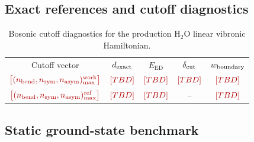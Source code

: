 \documentclass[
  reprint,
  amsmath,
  amssymb,
  aps,
  pra,
  nofootinbib,
  superscriptaddress,
  floatfix
]{revtex4-2}
\newcommand{\placeholder}[1]{\textcolor{red!70!black}{\ifmmode\left[#1\right]\else\textsf{[#1]}\fi}}
\newcommand{\ed}{\mathrm{ED}}
\newcommand{\HtwoO}{\mathrm{H_2O}}
\newcommand{\work}{\mathrm{work}}
\newcommand{\refc}{\mathrm{ref}}
\begin{document}
\subsection{Exact references and cutoff diagnostics}

\begin{table}[t]
\caption{\label{tab:h2o_cutoff_results}Bosonic cutoff diagnostics for the production \(\HtwoO\) linear vibronic Hamiltonian.}
\begin{ruledtabular}
\begin{tabular}{ccccc}
Cutoff vector & \(d_{\rm exact}\) & \(E_{\ed}\) & \(\delta_{\rm cut}\) & \(w_{\rm boundary}\) \\
\colrule
\(\placeholder{(n_{\rm bend},n_{\rm sym},n_{\rm asym})_{\max}^{\work}}\) & \(\placeholder{TBD}\) & \(\placeholder{TBD}\) & \(\placeholder{TBD}\) & \(\placeholder{TBD}\) \\
\(\placeholder{(n_{\rm bend},n_{\rm sym},n_{\rm asym})_{\max}^{\refc}}\) & \(\placeholder{TBD}\) & \(\placeholder{TBD}\) & -- & \(\placeholder{TBD}\) \\
\end{tabular}
\end{ruledtabular}
\end{table}

\subsection{Static ground-state benchmark}
\end{document}
